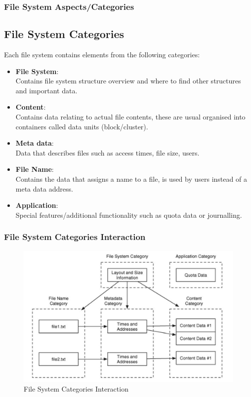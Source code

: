 \documentclass{beamer}
\begin{document}
\begin{frame}
	\frametitle{File System Aspects/Categories}
	\subsection*{File System Categories}
	Each file system contains elements from the following categories:
	\begin{itemize}
		\item \textbf{File System}: \\ Contains file system structure overview and where to find other structures and important data.
		\item \textbf{Content}: \\ Contains data relating to actual file contents, these are usual organised into containers called data units (block/cluster).
		\item \textbf{Meta data}: \\ Data that describes files such as access times, file size, users.
		\item \textbf{File Name}: \\ Contains the data that assigns a name to a file, is used by users instead of a meta data address.
		\item \textbf{Application}: \\ Special features/additional functionality such as quota data or journalling.	
	\end{itemize}	    
\end{frame}

\begin{frame}
	\frametitle{File System Categories Interaction}
	\begin{figure}[h]
		\includegraphics[scale=0.40]{fs-category-interaction-briancarrier}
		\caption{File System Categories Interaction}
		\label{fig:fs-category-interaction}
	\end{figure}
\end{frame}
\end{document}
